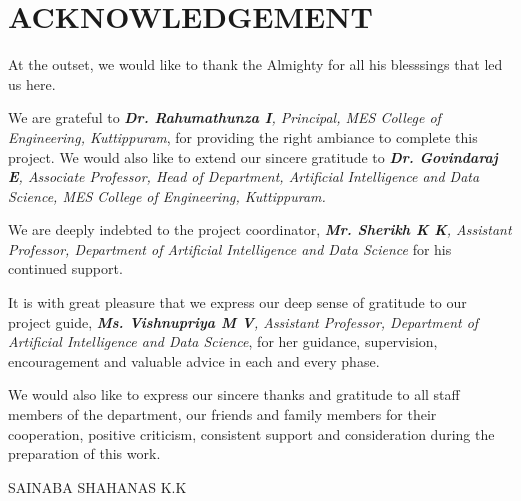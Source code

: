 \chapter*{ACKNOWLEDGEMENT}

\begin{acknowledgements}
\newcommand{\tab}{\hspace*{2em}}

\hspace{0.75cm}At the outset, we would like to thank the Almighty for all his blesssings that led us here. %

We are grateful to \emph{\textbf{Dr. Rahumathunza I}, Principal, MES College of Engineering, Kuttippuram}, for providing the right ambiance to complete this project. We would also like to extend our sincere gratitude to \emph{\textbf{Dr. Govindaraj E}, Associate Professor, Head of Department,  Artificial Intelligence and Data Science, MES College of Engineering, Kuttippuram.}

We are deeply indebted to the project coordinator, \emph{\textbf{Mr. Sherikh K K}, Assistant Professor, Department of Artificial Intelligence and Data Science} for his continued support.

It is with great pleasure that we express our deep sense of gratitude to our project guide, \emph{\textbf{Ms. Vishnupriya M V}, Assistant Professor,  Department of Artificial Intelligence and Data Science}, for her guidance, supervision, encouragement and valuable advice in each and every phase.

We would also like to express our sincere thanks and gratitude to all staff members of the department, our friends and family members for their cooperation, positive criticism, consistent support and consideration during the preparation of this work.
\vspace{1cm}
\begin{center}





        SAINABA SHAHANAS K.K \\
	

    
    
    
    
\end{center}



\end{acknowledgements}
